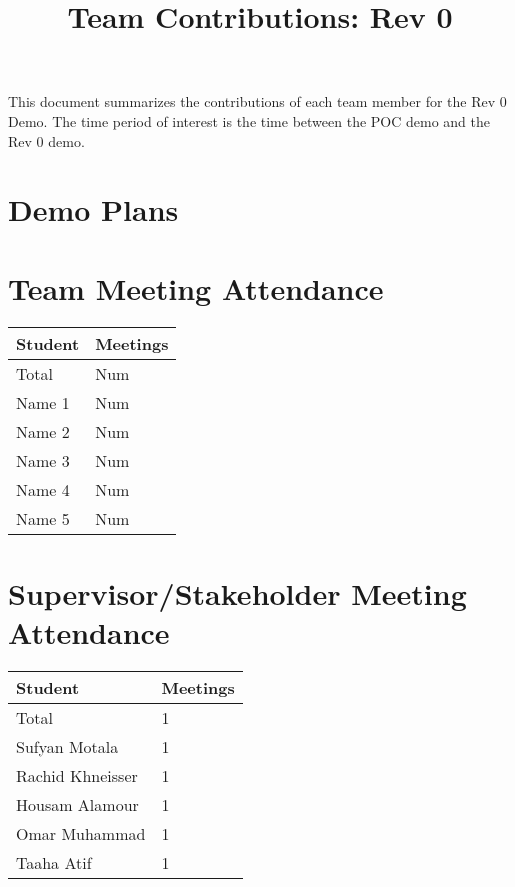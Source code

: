 \documentclass{article}
\title{Team Contributions: Rev 0\\\progname}
\author{\authname}
\date{}
\begin{document}
\maketitle

This document summarizes the contributions of each team member for the Rev 0
Demo.  The time period of interest is the time between the POC demo and the Rev
0 demo.

\section{Demo Plans}


\section{Team Meeting Attendance}


\begin{table}[H]
\centering
\begin{tabular}{ll}
\toprule
\textbf{Student} & \textbf{Meetings}\\
\midrule
Total & Num\\
Name 1 & Num\\
Name 2 & Num\\
Name 3 & Num\\
Name 4 & Num\\
Name 5 & Num\\
\bottomrule
\end{tabular}
\end{table}


\section{Supervisor/Stakeholder Meeting Attendance}

\begin{table}[H]
\centering
\begin{tabular}{ll}
\toprule
\textbf{Student} & \textbf{Meetings}\\
\midrule
Total & 1\\
Sufyan Motala & 1\\
Rachid Khneisser & 1\\
Housam Alamour & 1\\
Omar Muhammad & 1\\
Taaha Atif & 1\\
\bottomrule
\end{tabular}
\end{table}
\end{document}
